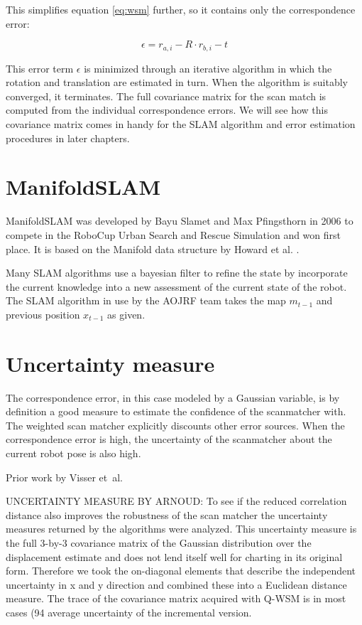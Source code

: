 This simplifies equation \ref{eq:wsm} further, so it contains only the correspondence error:

\begin{equation}
\epsilon = r_{a, i} - R \cdot r_{b, i} - t
\end{equation}

This error term $\epsilon$ is minimized through an iterative algorithm in which the rotation and translation are estimated in turn. When the algorithm is suitably converged, it terminates. The full covariance matrix for the scan match is computed from the individual correspondence errors. We will see how this covariance matrix comes in handy for the SLAM algorithm and error estimation procedures in later chapters.

\section{ManifoldSLAM}
ManifoldSLAM was developed by Bayu Slamet and Max Pfingsthorn in 2006 \cite{slametpfingsthornthesis} to compete in the RoboCup Urban Search and Rescue Simulation and won first place. It is based on the Manifold data structure by Howard et al. \cite{howard2006multirobot}. 

Many SLAM algorithms use a bayesian filter to refine the state by incorporate the current knowledge into a new assessment of the current state of the robot. The SLAM algorithm in use by the AOJRF team takes the map $m_{t-1}$ and previous position $x_{t-1}$ as given. 

\section{Uncertainty measure}
\label{uncertainty}
The correspondence error, in this case modeled by a Gaussian variable, is by definition a good measure to estimate the confidence of the scanmatcher with. The weighted scan matcher explicitly discounts other error sources. When the correspondence error is high, the uncertainty of the scanmatcher about the current robot pose is also high.

Prior work by Visser et~al.\ \cite{visser2009robust} 




\cite{visser2009robust}
UNCERTAINTY MEASURE BY ARNOUD:
To see if the reduced correlation distance also improves the robustness of
the scan matcher the uncertainty measures returned by the algorithms were
analyzed. This uncertainty measure is the full 3-by-3 covariance matrix of the
Gaussian distribution over the displacement estimate and does not lend itself well
for charting in its original form. Therefore we took the on-diagonal elements that
describe the independent uncertainty in x and y direction and combined these
into a Euclidean distance measure. The trace of the covariance matrix acquired
with Q-WSM is in most cases (94%
average uncertainty of the incremental version.



